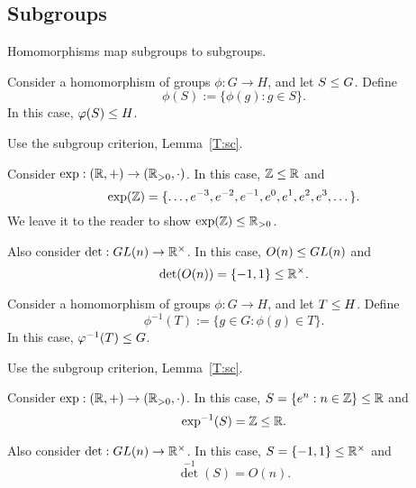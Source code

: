 \documentclass{ximera}
\begin{document}
\subsection{Subgroups}

Homomorphisms map subgroups to subgroups.


\begin{lemma}\label{L:hps}
  Consider a homomorphism of groups $\phi:G\to H$, and let $S\leq
  G$. Define
  \[
  \phi(S) := \{\phi(g): g\in S\}.
  \]
  In this case, $\varphi(S) \leq H$.
  \begin{sketch}
    Use the subgroup criterion, Lemma~\ref{T:sc}.
  \end{sketch}
\end{lemma}


\begin{example}
  Consider $\exp:(\mathbb R,+)\to(\mathbb R_{>0},\cdot)$. In this case,
  $\mathbb Z\leq\mathbb R$ and
  \[
  \exp(\mathbb Z) = \{\dots, e^{-3},e^{-2},e^{-1},e^0,e^1,e^2,e^3,\dots\}.
  \]
  We leave it to the reader to show $\exp(\mathbb Z)\leq \mathbb R_{>0}$.

  

  Also consider $\det:GL(n)\to \mathbb R^\times$. In this case, $O(n) \leq
  GL(n)$ and
  \[
  \det(O(n)) = \{-1,1\}\leq\mathbb R^\times.
  \]
\end{example}




\begin{lemma}\label{L:pps}
  Consider a homomorphism of groups $\phi:G\to H$, and let $T\leq
  H$. Define
  \[
  \phi^{-1}(T) := \{g\in G: \phi(g)\in T\}.
  \]
  In this case, $\varphi^{-1}(T) \leq G$.
  \begin{sketch}
    Use the subgroup criterion, Lemma~\ref{T:sc}.
  \end{sketch}
\end{lemma}

\begin{example}
  Consider $\exp:(\mathbb R,+)\to(\mathbb R_{>0},\cdot)$. In this case,
  $S=\{e^n:n\in\mathbb Z\}\leq\mathbb R$ and
  \[
  \exp^{-1}(S) = \mathbb Z\leq\mathbb R.
  \]

  

  Also consider $\det:GL(n)\to \mathbb R^\times$. In this case,
  $S=\{-1,1\}\leq \mathbb R^\times$ and
  \[
  {\det}^{-1}(S) = O(n).
  \]
\end{example}
\end{document}
